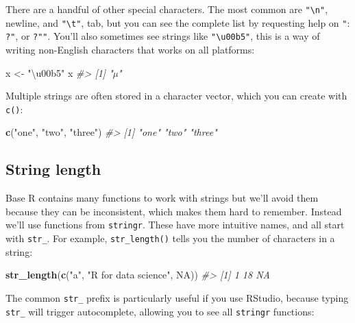 \documentclass[]{book}
\newenvironment{Shaded}{\begin{snugshade}}{\end{snugshade}}
\newcommand{\KeywordTok}[1]{\textcolor[rgb]{0.13,0.29,0.53}{\textbf{#1}}}
\newcommand{\StringTok}[1]{\textcolor[rgb]{0.31,0.60,0.02}{#1}}
\newcommand{\CommentTok}[1]{\textcolor[rgb]{0.56,0.35,0.01}{\textit{#1}}}
\newcommand{\OtherTok}[1]{\textcolor[rgb]{0.56,0.35,0.01}{#1}}
\newcommand{\NormalTok}[1]{#1}
\begin{document}
There are a handful of other special characters. The most common are
\texttt{"\textbackslash{}n"}, newline, and \texttt{"\textbackslash{}t"},
tab, but you can see the complete list by requesting help on \texttt{"}:
\texttt{?\textquotesingle{}"\textquotesingle{}}, or
\texttt{?"\textquotesingle{}"}. You'll also sometimes see strings like
\texttt{"\textbackslash{}u00b5"}, this is a way of writing non-English
characters that works on all platforms:

\begin{Shaded}
\begin{Highlighting}[]
\NormalTok{x <-}\StringTok{ "\textbackslash{}u00b5"}
\NormalTok{x}
\CommentTok{#> [1] "µ"}
\end{Highlighting}
\end{Shaded}

Multiple strings are often stored in a character vector, which you can
create with \texttt{c()}:

\begin{Shaded}
\begin{Highlighting}[]
\KeywordTok{c}\NormalTok{(}\StringTok{"one"}\NormalTok{, }\StringTok{"two"}\NormalTok{, }\StringTok{"three"}\NormalTok{)}
\CommentTok{#> [1] "one"   "two"   "three"}
\end{Highlighting}
\end{Shaded}

\subsection{String length}\label{string-length}

Base R contains many functions to work with strings but we'll avoid them
because they can be inconsistent, which makes them hard to remember.
Instead we'll use functions from \texttt{stringr}. These have more
intuitive names, and all start with \texttt{str\_}. For example,
\texttt{str\_length()} tells you the number of characters in a string:

\begin{Shaded}
\begin{Highlighting}[]
\KeywordTok{str_length}\NormalTok{(}\KeywordTok{c}\NormalTok{(}\StringTok{"a"}\NormalTok{, }\StringTok{"R for data science"}\NormalTok{, }\OtherTok{NA}\NormalTok{))}
\CommentTok{#> [1]  1 18 NA}
\end{Highlighting}
\end{Shaded}

The common \texttt{str\_} prefix is particularly useful if you use
RStudio, because typing \texttt{str\_} will trigger autocomplete,
allowing you to see all \texttt{stringr} functions:
\end{document}
